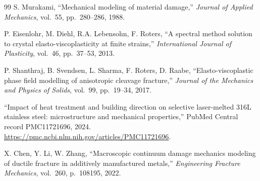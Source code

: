 \documentclass[12pt,a4paper,twocolumn]{article}
\begin{document}
\begin{thebibliography}{99}
S. Murakami, ``Mechanical modeling of material damage,'' \textit{Journal of Applied Mechanics}, vol.~55, pp.~280--286, 1988.

P. Eisenlohr, M. Diehl, R.A. Lebensohn, F. Roters, ``A spectral method solution to crystal elasto-viscoplasticity at finite strains,'' \textit{International Journal of Plasticity}, vol.~46, pp.~37--53, 2013.

P. Shanthraj, B. Svendsen, L. Sharma, F. Roters, D. Raabe, ``Elasto-viscoplastic phase field modelling of anisotropic cleavage fracture,'' \textit{Journal of the Mechanics and Physics of Solids}, vol.~99, pp.~19--34, 2017.

``Impact of heat treatment and building direction on selective laser-melted 316L stainless steel: microstructure and mechanical properties,'' PubMed Central record PMC11721696, 2024. \url{https://pmc.ncbi.nlm.nih.gov/articles/PMC11721696}.

X. Chen, Y. Li, W. Zhang, ``Macroscopic continuum damage mechanics modeling of ductile fracture in additively manufactured metals,'' \textit{Engineering Fracture Mechanics}, vol.~260, p.~108195, 2022.
\end{thebibliography}
\end{document}
